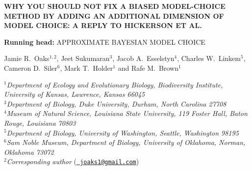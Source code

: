\documentclass[letterpaper,12pt]{article}
\begin{document}
\doublespacing
\raggedright
\setlength{\parindent}{0.5in}
\begin{linenumbers}

\begin{titlepage}
    \begin{flushleft}
        \sffamily

        \MakeUppercase{\large\bfseries Why you should not fix a biased
        model-choice method by adding an additional dimension of model choice:
        A reply to Hickerson et al.}

        \vspace{12pt}
        \textbf{Running head:} \MakeUppercase{Approximate Bayesian model
        choice}

        \vspace{12pt}
        Jamie R.\ Oaks$^{1,2}$, Jeet Sukumaran$^{3}$, Jacob A.\
        Esselstyn$^{4}$, Charles W.\ Linkem$^{5}$, Cameron D.\
        Siler$^{6}$, Mark T.\ Holder$^{1}$ and Rafe M.\ Brown$^{1}$

        \bigskip
        $^1$\emph{Department of Ecology and Evolutionary Biology,
            Biodiversity Institute,
            University of Kansas,
            Lawrence, Kansas 66045}\\[.1in]
        $^3$\emph{Department of Biology,
            Duke University,
            Durham, North Carolina 27708} \\[.1in]
        $^4$\emph{Museum of Natural Science,
            Louisiana State University,
            119 Foster Hall,
            Baton Rouge, Louisiana 70803}\\[.1in]
        $^5$\emph{Department of Biology,
            University of Washington,
            Seattle, Washington 98195}\\[.1in]
        $^6$\emph{Sam Noble Museum,
            Department of Biology,
            University of Oklahoma,
            Norman, Oklahoma 73072}\\[.1in]
        $^2$\emph{Corresponding author} (\href{mailto:joaks1@gmail.com}{\tt
        joaks1@gmail.com})\\

    \end{flushleft}
\end{titlepage}


\end{linenumbers}
\end{document}
